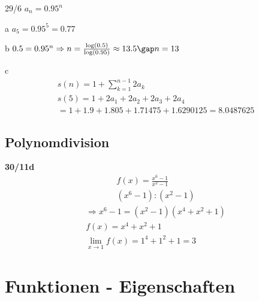 \begin{exercise}{29/6}
  $a_n = 0.95^n$
  \item [a]
  $a_5 = 0.95^5 = 0.77$
  \item [b]
  $0.5 = 0.95^n \Rightarrow n = \frac{\log(0.5)}{\log(0.95)} \approx 13.5 \gap n = 13$
  \item [c]
  \begin{gather*}
    s(n) = 1 + \sum_{k = 1}^{n - 1} 2a_k \\
    s(5) = 1 + 2a_1 + 2a_2 + 2a_3 + 2a_4 \\ = 1 + 1.9 + 1.805 + 1.71475 + 1.6290125 = 8.0487625
  \end{gather*}
\end{exercise}
\begin{onepage}
  \subsection{Polynomdivision}
  \textbf{30/11d} \\
  \begin{gather*}
    f(x) = \frac{x^6 - 1}{x^2 - 1} \\
    (x^6 - 1) : (x^2 - 1)
  \end{gather*}
  \begin{gather*}
    \Rightarrow x^6 - 1 = (x^2 - 1)(x^4 + x^2 + 1) \\
    f(x) = x^4 + x^2 + 1 \\
    \lim\limits_{x \to 1} f(x) = 1^4 + 1^2 + 1 = 3
  \end{gather*}
\end{onepage}

\section{Funktionen - Eigenschaften}
